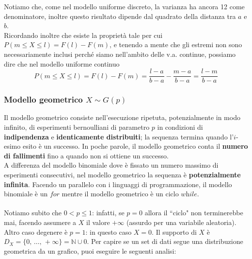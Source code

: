 \noindent Notiamo che, come nel modello uniforme discreto, la varianza ha ancora 12 come denominatore, inoltre questo risultato dipende dal quadrato della distanza tra $a$ e $b$. \\

\noindent Ricordando inoltre che esiste la proprietà tale per cui $P(m \leq X \leq l) = F(l) - F(m)$, e tenendo a mente che gli estremi non sono necessariamente inclusi perché siamo nell'ambito delle v.a. continue, possiamo dire che nel modello uniforme continuo $$P(m \leq X \leq l) = F(l) - F(m) = \frac{l - a}{b - a} - \frac{m - a}{b - a} = \frac{l - m}{b - a}$$

\subsubsection{Modello geometrico $X \sim G{(p)}$}
Il modello geometrico consiste nell'esecuzione ripetuta, potenzialmente in modo infinito, di esperimenti bernoulliani di parametro $p$ in condizioni di \textbf{indipendenza} e \textbf{identicamente distribuiti}; la sequenza termina quando l'$i$-esimo esito è un successo.
In poche parole, il modello geometrico conta il \textbf{numero di fallimenti} fino a quando non si ottiene un successo. \\
A differenza del modello binomiale dove è fissato un numero massimo di esperimenti consecutivi, nel modello geometrico la sequenza è \textbf{potenzialmente infinita}. 
Facendo un parallelo con i linguaggi di programmazione, il modello binomiale è un $\textit{for}$ mentre il modello geometrico è un ciclo $\textit{while}$. \\ \\
Notiamo subito che $0 < p \leq 1$: infatti, se $p = 0$ allora il ``ciclo" non terminerebbe mai, facendo assumere a $X$ il valore $+\infty$ (assurdo per una variabile aleatoria). Altro caso degenere è $p=1$: in questo caso $X = 0$. Il supporto di $X$ è $D_X = \{0, \, \dots ,\, +\infty\} = \mathbb{N} \cup 0$.
\newline \newline
Per capire se un set di dati segue una distribuzione geometrica da un grafico, puoi eseguire le seguenti analisi:
